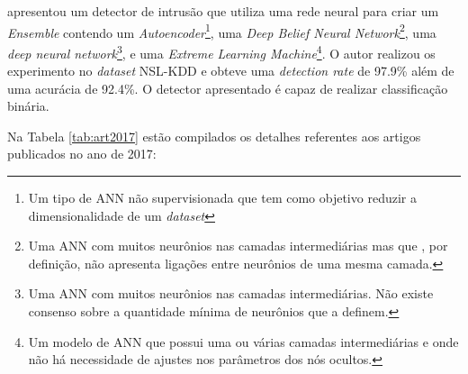  apresentou um detector de intrusão que utiliza uma rede neural para criar um \textit{Ensemble} contendo um \textit{Autoencoder}\footnote{Um tipo de ANN não supervisionada que tem como objetivo reduzir a dimensionalidade de um \textit{dataset}}, uma \textit{Deep Belief Neural Network}\footnote{Uma ANN com muitos neurônios nas camadas intermediárias mas que , por definição, não apresenta ligações entre neurônios de uma mesma camada.}, uma \textit{deep neural network}\footnote{Uma ANN com muitos neurônios nas camadas intermediárias. Não existe consenso sobre a quantidade mínima de neurônios que a definem.}, e uma \textit{Extreme Learning Machine}\footnote{Um modelo de ANN que possui uma ou várias camadas intermediárias e onde não há necessidade de ajustes nos parâmetros dos nós ocultos.}. O autor realizou os experimento no \textit{dataset} NSL-KDD e obteve uma \textit{detection rate} de 97.9\% além de uma acurácia de 92.4\%. O detector apresentado é capaz de realizar classificação binária.

Na Tabela \ref{tab:art2017} estão compilados os detalhes referentes aos artigos publicados no ano de 2017:


